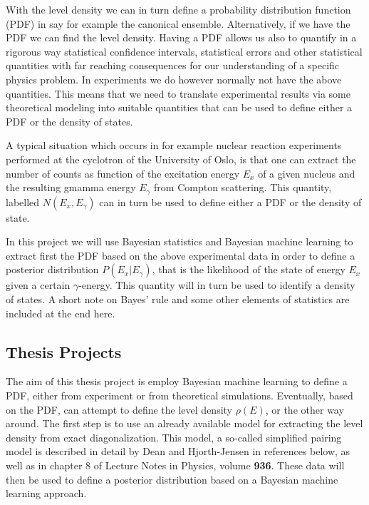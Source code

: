 \documentclass[%
oneside,                 %
final,                   %
10pt]{article}
\begin{document}
With the level density we can in turn define a probability
distribution function (PDF) in say for example the canonical
ensemble. Alternatively, if we have the PDF we can find the level density.
Having a PDF allows us also to quantify in a rigorous way statistical
confidence intervals, statistical errors and other statistical quantities with far reaching
consequences for our understanding of a specific physics problem. 
In experiments we do however normally not have the above
quantities. This means that we need to translate experimental results
via some theoretical modeling into suitable quantities that can be
used to define either a PDF or the density of states.

A typical situation which occurs in for example nuclear reaction
experiments performed at the cyclotron of the University of Oslo, is
that one can extract the number of counts as function of the
excitation energy $E_x$ of a given nucleus and the resulting gmamma
energy $E_{\gamma}$ from Compton scattering. This quantity, labelled
$N(E_x,E_{\gamma})$ can in turn be used to define either a PDF or the density of state.


In this project we will use Bayesian statistics and Bayesian machine
learning to extract first the PDF based on the above experimental data
in order to define a posterior distribution $P(E_x\vert E_{\gamma})$,
that is the likelihood of the state of energy $E_x$ given a certain
$\gamma$-energy.  This quantity will in turn be used to identify a
density of states. A short note on Bayes' rule and some other elements of statistics are included at the end here.


\subsection*{Thesis Projects}

The aim of this thesis project is employ Bayesian machine learning to
define a PDF, either from experiment or from theoretical simulations.
Eventually, based on the PDF, can attempt to define the level density
$\rho(E)$, or the other way around. The first step is to use an
already available model for extracting the level density from exact
diagonalization. This model, a so-called simplified pairing model is
described in detail by Dean and Hjorth-Jensen in references below, as
well as in chapter 8 of Lecture Notes in Physics, volume \textbf{936}.  These
data will then be used to define a posterior distribution based on a
Bayesian machine learning approach.
\end{document}
